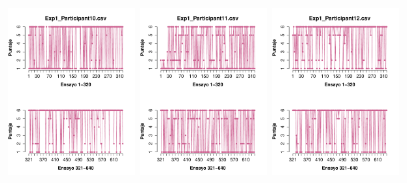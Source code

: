 \begin{figure}[th]
\includegraphics[width=0.30\textwidth]{Figures/Rating_Exp1_P10} \includegraphics[width=0.30\textwidth]{Figures/Rating_Exp1_P11} \includegraphics[width=0.30\textwidth]{Figures/Rating_Exp1_P12}

\end{figure}
